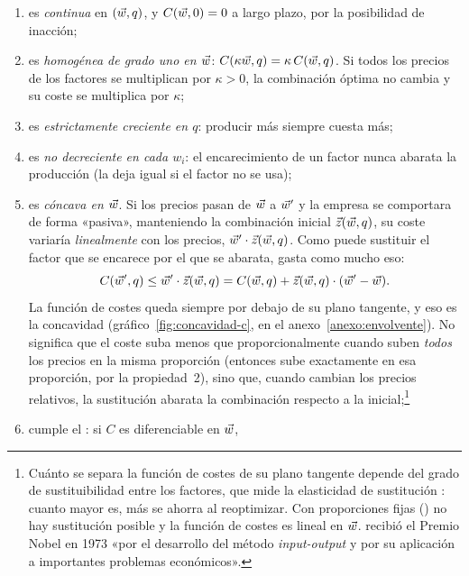\documentclass[11pt]{article}
\begin{document}
\begin{itemize}
  \begin{enumerate}
  \item es \emph{continua} en $(\vec{w},q)$, y $C(\vec{w},0)=0$ a largo plazo, por la posibilidad de inacción;
  \item es \emph{homogénea de grado uno en $\vec{w}$}: $C(\kappa\vec{w},q)=\kappa\,C(\vec{w},q)$. Si todos los precios de los factores se multiplican por $\kappa>0$, la combinación óptima no cambia y su coste se multiplica por $\kappa$;
  \item es \emph{estrictamente creciente en $q$}: producir más siempre cuesta más;
  \item es \emph{no decreciente en cada $w_i$}: el encarecimiento de un factor nunca abarata la producción (la deja igual si el factor no se usa);
  \item es \emph{cóncava en $\vec{w}$}. Si los precios pasan de $\vec{w}$ a $\vec{w}'$ y la empresa se comportara de forma «pasiva», manteniendo la combinación inicial $\vec{z}(\vec{w},q)$, su coste variaría \emph{linealmente} con los precios, $\vec{w}'\cdot\vec{z}(\vec{w},q)$. Como puede sustituir el factor que se encarece por el que se abarata, gasta como mucho eso:
    \begin{equation}
    C(\vec{w}',q)\leq\vec{w}'\cdot\vec{z}(\vec{w},q)=C(\vec{w},q)+\vec{z}(\vec{w},q)\cdot(\vec{w}'-\vec{w}). \label{eq:concavidad-c}
    \end{equation}
    La función de costes queda siempre por debajo de su plano tangente, y eso es la concavidad (gráfico~\ref{fig:concavidad-c}, en el anexo~\ref{anexo:envolvente}). No significa que el coste suba menos que proporcionalmente cuando suben \emph{todos} los precios en la misma proporción (entonces sube exactamente en esa proporción, por la propiedad~2), sino que, cuando cambian los precios relativos, la sustitución abarata la combinación respecto a la inicial;\footnote{Cuánto se separa la función de costes de su plano tangente depende del grado de sustituibilidad entre los factores, que mide la elasticidad de sustitución : cuanto mayor es, más se ahorra al reoptimizar. Con proporciones fijas () no hay sustitución posible y la función de costes es lineal en $\vec{w}$.  recibió el Premio Nobel en 1973 «por el desarrollo del método \emph{input-output} y por su aplicación a importantes problemas económicos»\nocite{Nobel1973Leontief}.}
  \item cumple el \nocite{Shephard1953Cost}: si $C$ es diferenciable en $\vec{w}$,

\end{enumerate}
\end{itemize}
\end{document}
